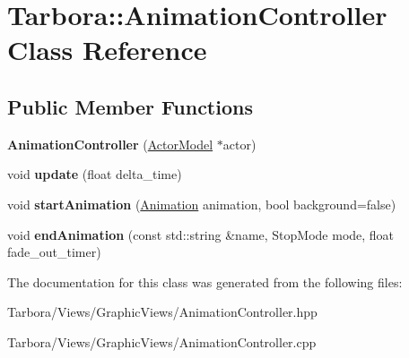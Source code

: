 \hypertarget{classTarbora_1_1AnimationController}{}\section{Tarbora\+:\+:Animation\+Controller Class Reference}
\label{classTarbora_1_1AnimationController}
\subsection*{Public Member Functions}
\begin{DoxyCompactItemize}
\item 
\mbox{\label{classTarbora_1_1AnimationController_a35d1dd8f3c358e32593c20b1e26fa292}} 
{\bfseries Animation\+Controller} (\hyperlink{classTarbora_1_1ActorModel}{Actor\+Model} $\ast$actor)
\item 
\mbox{\label{classTarbora_1_1AnimationController_a82a408fc56cacb9acb994ac9636a9de9}} 
void {\bfseries update} (float delta\+\_\+time)
\item 
\mbox{\label{classTarbora_1_1AnimationController_a1cab86996cf0427bbabaaabe720ca460}} 
void {\bfseries start\+Animation} (\hyperlink{structTarbora_1_1Animation}{Animation} animation, bool background=false)
\item 
\mbox{\label{classTarbora_1_1AnimationController_aeee9f8cf647d1916e82f61f39346a849}} 
void {\bfseries end\+Animation} (const std\+::string \&name, Stop\+Mode mode, float fade\+\_\+out\+\_\+timer)
\end{DoxyCompactItemize}


The documentation for this class was generated from the following files\+:\begin{DoxyCompactItemize}
\item 
Tarbora/\+Views/\+Graphic\+Views/Animation\+Controller.\+hpp\item 
Tarbora/\+Views/\+Graphic\+Views/Animation\+Controller.\+cpp\end{DoxyCompactItemize}
